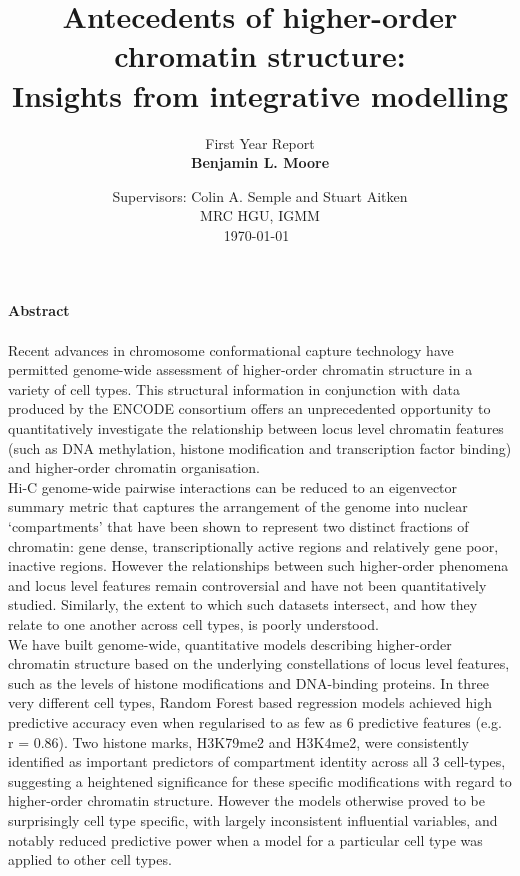 \documentclass[a4paper]{report}
\title{ \vspace{1in} Antecedents of higher-order chromatin structure: \\ Insights from integrative modelling}
\author{ First Year Report \\ {\bf Benjamin L. Moore} }
\date{Supervisors: Colin A. Semple and Stuart Aitken \\ \vspace{24pt}
  \normalsize{MRC HGU, IGMM}
 \\ \today~ }
\begin{document}
\doublespacing
\maketitle
\tableofcontents
\pagebreak
{}
{\huge {\bf Abstract}}\\
\vspace{-2pt} \\
Recent advances in chromosome conformational capture technology have permitted genome-wide assessment of
higher-order chromatin structure in a variety of cell types. This
structural information in conjunction with data produced by the ENCODE
consortium offers an unprecedented opportunity to quantitatively
investigate the relationship between locus level chromatin features
(such as DNA methylation, histone modification and transcription
factor binding) and higher-order chromatin organisation. \\

Hi-C genome-wide pairwise interactions can be reduced to an
eigenvector summary metric that captures the arrangement of the genome
into nuclear ‘compartments’ that have been shown to represent two
distinct fractions of chromatin: gene dense, transcriptionally active
regions and relatively gene poor, inactive regions. However the
relationships between such higher-order phenomena and locus level
features remain controversial and have not been quantitatively
studied. Similarly, the extent to which such datasets intersect, and
how they relate to one another across cell types, is poorly
understood. \\

We have built genome-wide, quantitative models describing higher-order
chromatin structure based on the underlying constellations of locus
level features, such as the levels of histone modifications and
DNA-binding proteins. In three very different cell types, Random
Forest based regression models achieved high predictive accuracy even
when regularised to as few as 6 predictive features (e.g. r =
0.86). Two histone marks, H3K79me2 and H3K4me2, were consistently
identified as important predictors of compartment identity across all
3 cell-types, suggesting a heightened significance for these specific
modifications with regard to higher-order chromatin structure. However
the models otherwise proved to be surprisingly cell type specific,
with largely inconsistent influential variables, and notably reduced
predictive power when a model for a particular cell type was applied
to other cell types. \\
\end{document}
